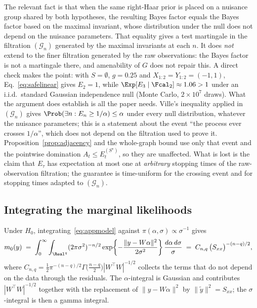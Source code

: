 \begin{appendices}
The relevant fact \citep{berger1998bayes,hendriksen2021optional} is that when
the same right-Haar prior is placed on a nuisance group shared by both
hypotheses, the resulting Bayes factor equals the Bayes factor based on the
maximal invariant, whose distribution under the null does not depend on the
nuisance parameters. That equality gives a test martingale in the filtration $(\mathcal G_n)$
generated by the maximal invariants at each $n$. It does \emph{not} extend to
the finer filtration generated by the raw observations: the Bayes factor is
not a martingale there, and amenability of $G$ does not repair this. A direct
check makes the point: with $S = \emptyset$, $g = 0.25$ and
$X_{1:2} = Y_{1:2} = (-1, 1)$, Eq.~\eqref{eq:safelinear} gives $E_2 = 1$, while
$\Exp[E_3 \mid \Fcal_2] \approx 1.06 > 1$ under an i.i.d.\ standard Gaussian
independence null (Monte Carlo, $2 \times 10^7$ draws). What the argument does
establish is all the paper needs. Ville's inequality applied in
$(\mathcal G_n)$ gives $\Prob(\exists n: E_n \ge 1/\alpha) \le \alpha$ under
every null distribution, whatever the nuisance parameters; this is a
statement about the event ``the process ever crosses $1/\alpha$'', which does
not depend on the filtration used to prove it. Proposition~\ref{prop:adjacency}
and the whole-graph bound use only that event and the pointwise domination
$A_t \le E^{(S^\star)}_t$, so they are unaffected. What is lost is the claim
that $E_\tau$ has expectation at most one at \emph{arbitrary} stopping times of
the raw-observation filtration; the guarantee is time-uniform for the
crossing event and for stopping times adapted to $(\mathcal G_n)$.

\subsection{Integrating the marginal likelihoods}

Under $H_0$, integrating~\eqref{eq:appmodel} against $\pi(\alpha,\sigma)
\propto \sigma^{-1}$ gives
\begin{equation}\label{eq:m0}
m_0(y) \;=\; \int_0^\infty \int_{\Real^q}
  (2\pi\sigma^2)^{-n/2}
  \exp\!\left\{-\frac{\|y - W\alpha\|^2}{2\sigma^2}\right\}
  \frac{d\alpha \, d\sigma}{\sigma}
\;=\; C_{n,q} \, \bigl(S_{xx}\bigr)^{-(n-q)/2},
\end{equation}
where $C_{n,q} = \tfrac12 \pi^{-(n-q)/2} \Gamma\!\bigl(\tfrac{n-q}{2}\bigr)
|W^\top W|^{-1/2}$ collects the terms that do not depend on the data through
the residuals. The $\alpha$-integral is Gaussian and contributes
$|W^\top W|^{-1/2}$ together with the replacement of $\|y-W\alpha\|^2$ by
$\|\tilde y\|^2 = S_{xx}$; the $\sigma$-integral is then a gamma integral.


\end{appendices}
